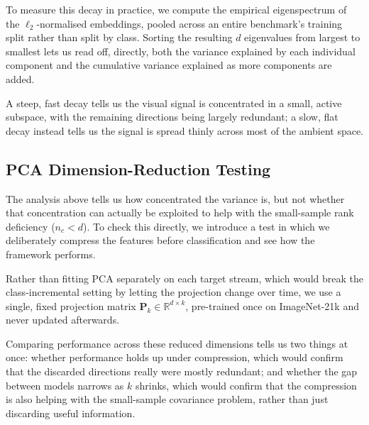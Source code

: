 To measure this decay in practice, we compute the empirical eigenspectrum of the $\ell_2$-normalised embeddings, pooled across an entire benchmark's training split rather than split by class. Sorting the resulting $d$ eigenvalues from largest to smallest lets us read off, directly, both the variance explained by each individual component and the cumulative variance explained as more components are added.

A steep, fast decay tells us the visual signal is concentrated in a small, active subspace, with the remaining directions being largely redundant; a slow, flat decay instead tells us the signal is spread thinly across most of the ambient space. 

\subsection{PCA Dimension-Reduction Testing}
\label{sec:method:spectral:pca_test}

The analysis above tells us how concentrated the variance is, but not whether that concentration can actually be exploited to help with the small-sample rank deficiency ($n_c < d$). To check this directly, we introduce a test in which we deliberately compress the features before classification and see how the framework performs.

Rather than fitting PCA separately on each target stream, which would break the class-incremental setting by letting the projection change over time, we use a single, fixed projection matrix $\mathbf{P}_k \in \mathbb{R}^{d\times k}$, pre-trained once on ImageNet-21k and never updated afterwards. 

Comparing performance across these reduced dimensions tells us two things at once: whether performance holds up under compression, which would confirm that the discarded directions really were mostly redundant; and whether the gap between models narrows as $k$ shrinks, which would confirm that the compression is also helping with the small-sample covariance problem, rather than just discarding useful information.

